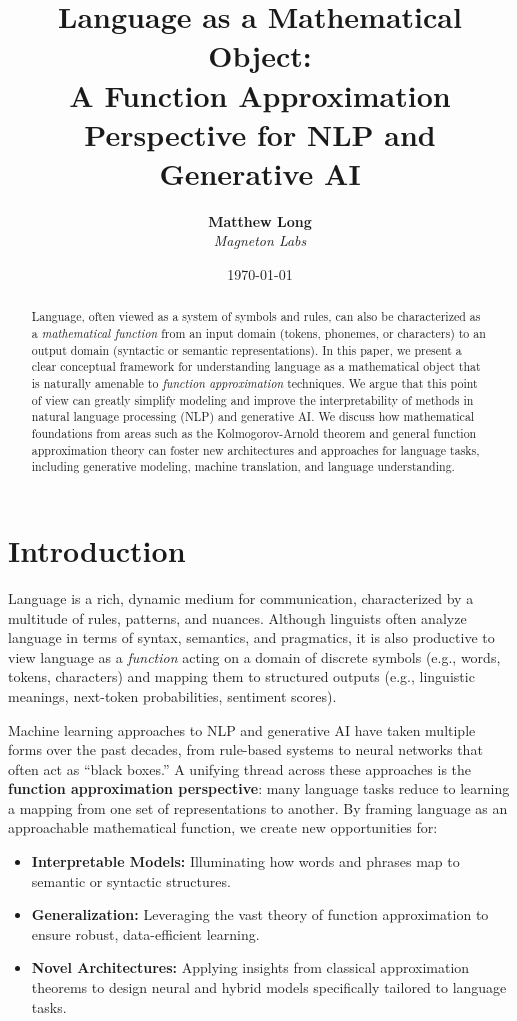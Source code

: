 \documentclass[11pt]{article}
\title{\textbf{Language as a Mathematical Object: \\
A Function Approximation Perspective for NLP and Generative AI}}
\author{
  \textbf{Matthew Long}\\
  \textit{Magneton Labs}
}
\date{\today}
\begin{document}
\maketitle

\begin{abstract}
Language, often viewed as a system of symbols and rules, can also be characterized as a \emph{mathematical function} from an input domain (tokens, phonemes, or characters) to an output domain (syntactic or semantic representations). In this paper, we present a clear conceptual framework for understanding language as a mathematical object that is naturally amenable to \emph{function approximation} techniques. We argue that this point of view can greatly simplify modeling and improve the interpretability of methods in natural language processing (NLP) and generative AI. We discuss how mathematical foundations from areas such as the Kolmogorov-Arnold theorem and general function approximation theory can foster new architectures and approaches for language tasks, including generative modeling, machine translation, and language understanding.
\end{abstract}

\section{Introduction}
Language is a rich, dynamic medium for communication, characterized by a multitude of rules, patterns, and nuances. Although linguists often analyze language in terms of syntax, semantics, and pragmatics, it is also productive to view language as a \emph{function} acting on a domain of discrete symbols (e.g., words, tokens, characters) and mapping them to structured outputs (e.g., linguistic meanings, next-token probabilities, sentiment scores).

Machine learning approaches to NLP and generative AI have taken multiple forms over the past decades, from rule-based systems to neural networks that often act as ``black boxes.'' A unifying thread across these approaches is the \textbf{function approximation perspective}: many language tasks reduce to learning a mapping from one set of representations to another. By framing language as an approachable mathematical function, we create new opportunities for:
\begin{itemize}
    \item \textbf{Interpretable Models:} Illuminating how words and phrases map to semantic or syntactic structures.
    \item \textbf{Generalization:} Leveraging the vast theory of function approximation to ensure robust, data-efficient learning.
    \item \textbf{Novel Architectures:} Applying insights from classical approximation theorems to design neural and hybrid models specifically tailored to language tasks.
\end{itemize}
\end{document}
